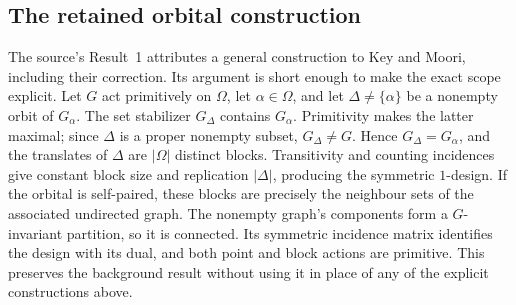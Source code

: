 \subsection{The retained orbital construction}
The source's Result~1 attributes a general construction to Key and Moori,
including their correction. Its argument is short enough to make the
exact scope explicit. Let $G$ act primitively on $\Omega$, let $\alpha\in
\Omega$, and let $\Delta\ne\{\alpha\}$ be a nonempty orbit of $G_\alpha$.
The set stabilizer $G_\Delta$ contains $G_\alpha$. Primitivity makes the
latter maximal; since $\Delta$ is a proper nonempty subset,
$G_\Delta\ne G$. Hence $G_\Delta=G_\alpha$, and the translates of $\Delta$
are $|\Omega|$ distinct blocks. Transitivity and counting incidences give
constant block size and replication $|\Delta|$, producing the symmetric
$1$-design. If the orbital is self-paired, these blocks are precisely the
neighbour sets of the associated undirected graph. The nonempty graph's
components form a $G$-invariant partition, so it is connected. Its
symmetric incidence matrix identifies the design with its dual, and both
point and block actions are primitive. This preserves the background
result without using it in place of any of the explicit constructions above.
